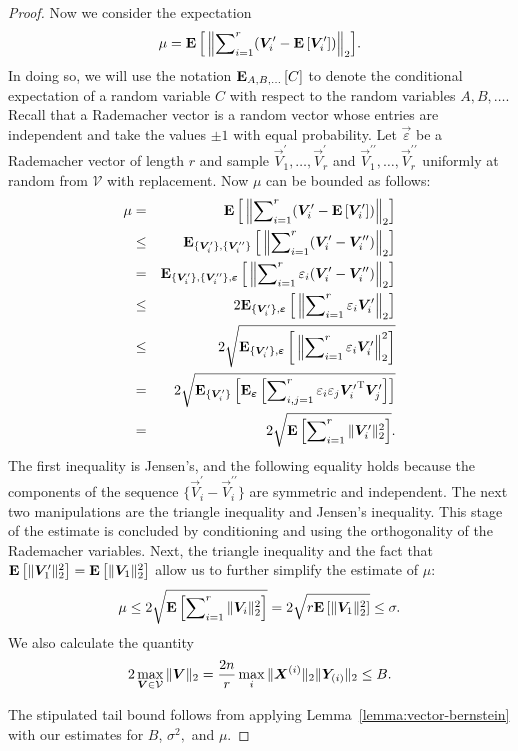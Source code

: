 \begin{proof}
Now we consider the expectation
\[
 \mu  =  {{\mathbf E}\left[\mbox{}\left\|\sum\nolimits_{i=1}^r (\bm{V}_i^\prime - {{\mathbf E}\left[\bm{V}_i^\prime\right]})\right\|_2\right]}.
\]
In doing so, we will use the notation $\mathbf{E}_{A,B,\ldots}\left[{C}\right] $ to denote the conditional expectation of a random variable $C$ with respect to the random variables $A,B,\ldots.$
Recall that a Rademacher vector is a random vector whose entries are independent and take the values $\pm 1$ with equal probability. Let $\vec{\varepsilon}$ be a Rademacher vector of length $r$ and sample $\vec{V}_1^\prime, \ldots, \vec{V}_r^\prime$ and $\vec{V}_1^{\prime\prime}, \ldots, \vec{V}_r^{\prime\prime}$ uniformly at random from $\mathcal{V}$ with replacement. Now $\mu$ can be bounded as follows:
\begin{eqnarray*}
 \mu  & =  & {{\mathbf E}\left[\mbox{}\left\|\sum\nolimits_{i=1}^r (\bm{V}_i^\prime - {{\mathbf E}\left[\bm{V}_i^\prime\right]})\right\|_2\right]} \\
      &\leq& \mathbf{E}_{\{\bm{V}_i^\prime\}, \{\bm{V}_i^{\prime\prime}\}}\left[{\mbox{}\left\|\sum\nolimits_{i=1}^r (\bm{V}_i^\prime - \bm{V}_i^{\prime\prime})\right\|_2}\right]  \\
      & =  & \mathbf{E}_{\{\bm{V}_i^\prime\}, \{\bm{V}_i^{\prime\prime}\}, \bm{\varepsilon}}\left[{\mbox{}\left\|\sum\nolimits_{i=1}^r \varepsilon_i (\bm{V}_i^\prime - \bm{V}_i^{\prime\prime})\right\|_2}\right] \\
      &\leq& 2 \mathbf{E}_{\{\bm{V}_i^\prime\}, \bm{\varepsilon}}\left[{\mbox{}\left\|\sum\nolimits_{i=1}^r \varepsilon_i \bm{V}_i^\prime\right\|_2}\right]  \\
      &\leq& 2 \sqrt{ \mathbf{E}_{\{\bm{V}_i^\prime\}, \bm{\varepsilon}}\left[{\mbox{}\left\|\sum\nolimits_{i=1}^r \varepsilon_i \bm{V}_i^\prime\right\|_2^2}\right]  }\\
      & = & 2 \sqrt{ \mathbf{E}_{\{\bm{V}_i^\prime\}}\left[{\mathbf{E}_{\bm{\varepsilon}}\left[{\sum\nolimits_{i,j=1}^r \varepsilon_i \varepsilon_j {\bm{V}_i^\prime}^{\textsc{T}} \bm{V}_j^\prime}\right]  }\right] }\\
      &=& 2 \sqrt{{{\mathbf E}\left[ \sum\nolimits_{i=1}^r \mbox{}\|\bm{V}_i^\prime\|_2^2\right]} }.
\end{eqnarray*}
The first inequality is Jensen's, and the following equality holds because the components of the sequence $\{\vec{V}_i^\prime - \vec{V}_i^{\prime\prime}\}$ are symmetric and independent. The next two manipulations are the triangle inequality and Jensen's inequality. This stage of the estimate is concluded by conditioning and using the orthogonality of the Rademacher variables. Next, the triangle inequality and the fact that ${{\mathbf E}\left[\mbox{}\|\bm{V}_1^\prime\|_2^2\right]} = {{\mathbf E}\left[\mbox{}\|\bm{V}_1\|_2^2\right]}$ allow us to further simplify the estimate of $\mu:$
\[
 \mu \leq 2 \sqrt{{{\mathbf E}\left[ \sum\nolimits_{i=1}^r \mbox{}\|\bm{V}_i\|_2^2\right]} } = 2 \sqrt{r {{\mathbf E}\left[\mbox{}\|\bm{V}_1\|_2^2\right]}} \leq \sigma.
\]
We also calculate the quantity
\[
2 \max_{\bm{V} \in \mathcal{V}} \mbox{}\|\bm{V}\|_2 = {2n\over r} \max_i \mbox{}\|\bm{X}^{(i)}\|_2\mbox{}\|\bm{Y}_{(i)}\|_2 \leq B.
\]

The stipulated tail bound follows from applying Lemma~\ref{lemma:vector-bernstein} with our estimates for $B$, $\sigma^2,$ and $\mu.$
\end{proof}
